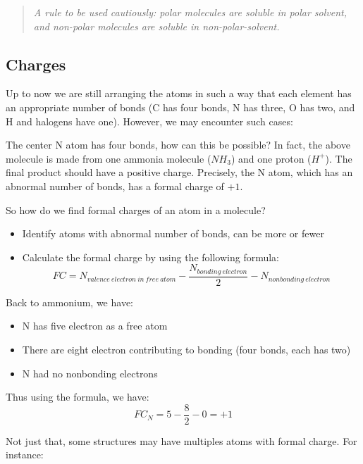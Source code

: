 \documentclass{report}
\begin{document}
		\blockquote{\textit{A rule to be used cautiously: polar molecules are soluble in polar solvent, and non-polar molecules are soluble in non-polar-solvent.}}
		
		\subsection{Charges}
		Up to now we are still arranging the atoms in such a way that each element has an appropriate number of bonds (C has four bonds, N has three, O has two, and H and halogens have one). However, we may encounter such cases:
		\begin{center}
		\end{center}
		
		The center N atom has four bonds, how can this be possible? In fact, the above molecule is made from one ammonia molecule ($NH_3$) and one proton ($H^+$). The final product should have a positive charge. Precisely, the N atom, which has an abnormal number of bonds, has a formal charge of $+1$.
		\begin{center}
		\end{center}
	
		So how do we find formal charges of an atom in a molecule?
		\begin{itemize}
			\item{Identify atoms with abnormal number of bonds, can be more or fewer}
			\item{Calculate the formal charge by using the following formula:}
				\[FC = N_{valence\:electron\:in\:free\:atom} - \frac{N_{bonding\:electron}}{2} - N_{nonbonding\:electron}\]
		\end{itemize}
		
		Back to ammonium, we have:
		\begin{itemize}
			\item{N has five electron as a free atom}
			\item{There are eight electron contributing to bonding (four bonds, each has two)}
			\item{N had no nonbonding electrons}
		\end{itemize}
		 Thus using the formula, we have:
		 	\[FC_N = 5 - \frac{8}{2} - 0 = +1\]
			
		Not just that, some structures may have multiples atoms with formal charge. For instance:
		\begin{center}
		\end{center}
		
\end{document}
